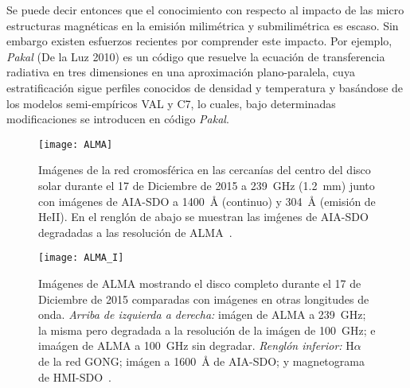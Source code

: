 Se puede decir entonces que el conocimiento con respecto al impacto de las micro estructuras magn\'eticas en la emisi\'on milim\'etrica y submilim\'etrica es escaso. Sin embargo existen esfuerzos recientes por comprender este impacto. Por ejemplo, \emph{Pakal} (De la Luz 2010) es un c\'odigo que resuelve la ecuaci\'on de transferencia radiativa en tres dimensiones en una aproximaci\'on plano-paralela, cuya estratificaci\'on sigue perfiles conocidos de densidad y temperatura y bas\'andose de los modelos semi-emp\'iricos VAL y C7, lo cuales, bajo determinadas modificaciones se introducen en c\'odigo \emph{Pakal}.

\begin{figure}[ht]
\centering
\texttt{[image: ALMA]}
\caption{Im\'agenes de la red cromosf\'erica en las cercan\'ias del centro del disco solar durante el 17 de Diciembre de 2015 a 239~GHz (1.2~mm) junto con im\'agenes de AIA-SDO a 1400~$\mbox{\AA}$ (continuo) y 304~$\mbox{\AA}$ (emisi\'on de HeII). En el rengl\'on de abajo se muestran las im\'genes de AIA-SDO degradadas a las resoluci\'on de ALMA~\citep{2017A&A...605A..78A}.}
\label{fig:chromosphericnet1}
\end{figure}

\begin{figure}[ht]
\centering
\texttt{[image: ALMA\_I]}
\caption{Im\'agenes de ALMA mostrando el disco completo durante el 17 de Diciembre de 2015 comparadas con im\'agenes en otras longitudes de onda. \emph{Arriba de izquierda a derecha: }im\'agen de ALMA a 239~GHz; la misma pero degradada a la resoluci\'on de la im\'agen de 100~GHz; e ima\'agen de ALMA a 100~GHz sin degradar. \emph{Rengl\'on inferior: } H$\alpha$ de la red GONG; im\'agen a 1600~$\mbox{\AA}$ de AIA-SDO; y magnetograma de HMI-SDO~\citep{2017A&A...605A..78A}.}
\label{fig:chromosphericnet2}
\end{figure}





